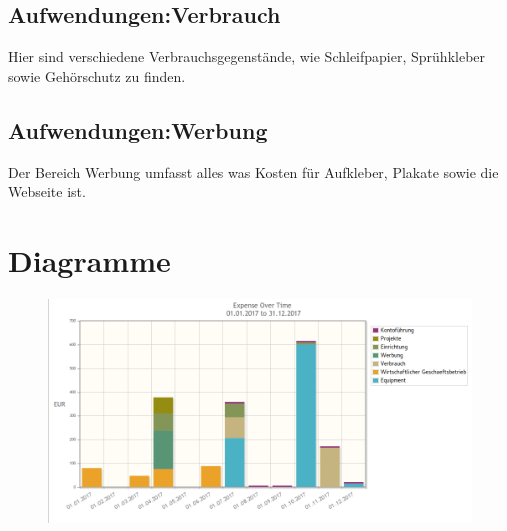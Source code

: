\documentclass[12pt,a4paper]{article}
\begin{document}
\subsection{Aufwendungen:Verbrauch}
Hier sind verschiedene Verbrauchsgegenstände, wie Schleifpapier, Sprühkleber sowie Gehörschutz zu finden.

\subsection{Aufwendungen:Werbung}
Der Bereich Werbung umfasst alles was Kosten für Aufkleber, Plakate sowie die Webseite ist.

\section{Diagramme}

\begin{figure}
  \includegraphics[width=\linewidth]{pics/expense_2017.png}
\end{figure}
\end{document}

